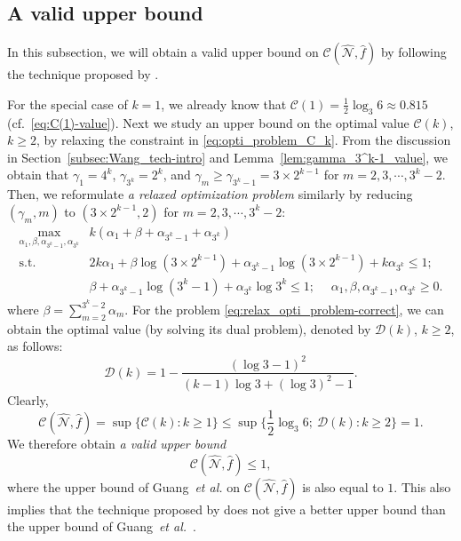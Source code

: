 \documentclass[11pt,draftclsnofoot,onecolumn]{IEEEtran}
\begin{document}
\begin{journalonly}
{\subsection{A valid upper bound}\label{subsec:corr_tech}

  In this subsection, we will obtain a valid upper bound on $\mathcal{C}(\widehat{\mathcal{N}},\widehat{f})$ by following the technique proposed by \cite{Wang-Tightness_upper_bound}.

For the special case of $k=1$, we already know that $\mathcal{C}(1)=\frac{1}{2}\log_{3}6\approx 0.815$ (cf.~\eqref{eq:C(1)-value}).
Next we study an upper bound on the optimal value $\mathcal{C}(k)$, $k\geq2$, by
relaxing the constraint in \eqref{eq:opti_problem_C_k}. From the discussion in Section~\ref{subsec:Wang_tech-intro} and Lemma~\ref{lem:gamma_3^k-1_value}, we obtain that $\gamma_{1}=4^k$, $\gamma_{3^k}=2^k$, and  $\gamma_{m}\geq\gamma_{3^{k}-1}= 3\times2^{k-1}$ for $m =  2,3,\cdots, 3^{k}-2$.
Then, we  reformulate \emph{a relaxed optimization problem} similarly by reducing $(\gamma_{m},m)$ to $(3\times2^{k-1},2)$ for $m=2,3,\cdots,3^{k}-2$:
 \begin{equation}
	\begin{split}
		\max_{\alpha_{1},\beta,\alpha_{3^{k}-1},\alpha_{3^{k}}}&k(\alpha_{1}+\beta+\alpha_{3^{k}-1}+\alpha_{3^{k}})\\
		\text{s.t.}\quad&2k\alpha_{1}+\beta\log(3\times2^{k-1})+\alpha_{3^{k}-1}\log(3\times2^{k-1})+k\alpha_{3^{k}}\leq 1;\\
		&\beta+\alpha_{3^{k}-1}\log(3^{k}-1)+\alpha_{3^{k}}\log3^{k}\leq 1; \quad\;\alpha_{1},\beta,\alpha_{3^{k}-1},\alpha_{3^{k}}\geq 0.
	\end{split}\label{eq:relax_opti_problem-correct}
\end{equation}
where $\beta=\sum_{m=2}^{3^{k}-2}\alpha_{m}$.
For the problem \eqref{eq:relax_opti_problem-correct},
 we can obtain  the  optimal value (by solving its dual problem),  denoted by $\mathcal{D}(k)$, $k\geq 2$,  as follows:
\begin{equation}\nonumber
	\mathcal{D}(k)=	1-\frac{(\log3-1)^{2}}{(k-1)\log3+(\log3)^{2}-1}.
\end{equation}
 Clearly,
  \begin{equation}
		\mathcal{C}(\widehat{\mathcal{N}},\widehat{f})=\sup\{ \mathcal{C}(k): k\geq 1\}\leq\sup\Big\{\frac{1}{2}\log_{3}6; ~\mathcal{D}(k): k\geq 2\Big\}=1.
\end{equation}
We therefore obtain \emph{a valid upper bound}
\begin{equation}
\mathcal{C}(\widehat{\mathcal{N}},\widehat{f})\leq 1,
 \end{equation}
 where the upper bound of Guang~\emph{et al.} on $\mathcal{C}(\widehat{\mathcal{N}},\widehat{f})$ is also equal to $1$.
 This also implies that the technique proposed by \cite{Wang-Tightness_upper_bound} does not give a better upper bound than  the upper bound of Guang~\emph{et al.}~\cite{Guang_Improved_upper_bound}.
}

\end{journalonly}
\end{document}
